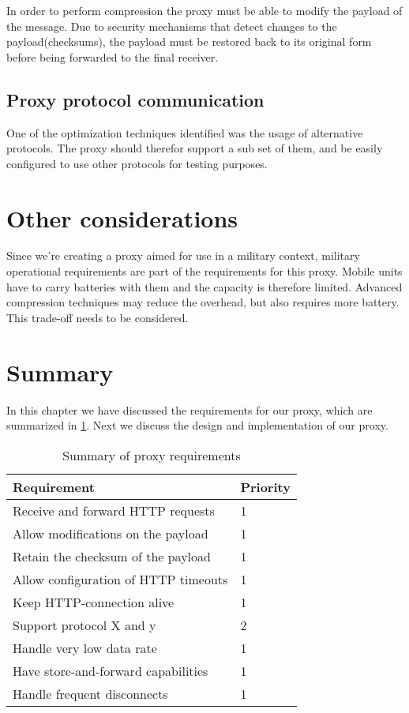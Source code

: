 In order to perform compression the proxy must be able to modify the payload of
the message. Due to security mechanisms that detect changes to the
payload(checksums), the payload must be restored back to its original form
before being forwarded to the final receiver.

\subsection{Proxy protocol communication}

One of the optimization techniques identified was the usage of alternative
protocols. The proxy should therefor support a sub set of them, and be easily
configured to use other protocols for testing purposes.

\section{Other considerations}

Since we're creating a proxy aimed for use in a military context, military
operational requirements are part of the requirements for this proxy. Mobile
units have to carry batteries with them and the capacity is therefore limited.
Advanced compression techniques may reduce the overhead, but also requires more
battery. This trade-off needs to be considered.



\section{Summary}

In this chapter we have discussed the requirements for our proxy, which are summarized in \cref{table-proxy-requirements}. Next we discuss the design and implementation of our proxy.


\begin{table}[h]
\begin{tabular}{| l | l |}
\hline
  \textbf{Requirement} & \textbf{Priority} \\ \hline
  Receive and forward HTTP requests & 1\\ \hline
  Allow modifications on the payload & 1 \\ \hline
  Retain the checksum of the payload & 1 \\ \hline
  Allow configuration of HTTP timeouts & 1 \\ \hline
  Keep HTTP-connection alive & 1 \\ \hline
  Support protocol X and y & 2 \\ \hline
  Handle very low data rate & 1 \\ \hline
  Have store-and-forward capabilities & 1 \\ \hline
  Handle frequent disconnects & 1\\ \hline
\end{tabular}
\caption{Summary of proxy requirements}
\label{table-proxy-requirements}
\end{table}
